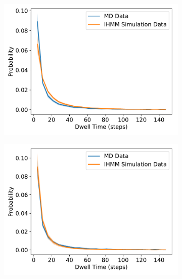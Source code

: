 \documentclass[journal=jpcbfk,manuscript=article]{achemso}
\begin{document}
  \begin{figure}
  \centering
  \begin{subfigure}{0.32\textwidth}
  \includegraphics[width=\textwidth]{dwell_distributions.pdf}
  \caption{}\label{fig:dwell_distributions}
  \end{subfigure}
  \begin{subfigure}{0.32\textwidth}
  \includegraphics[width=\textwidth]{dwell_distributions_modT.pdf}
  \caption{}\label{fig:dwell_distributions_modT}
  \end{subfigure}
  \begin{subfigure}{0.32\textwidth}

\end{subfigure}
\end{figure}
\end{document}
